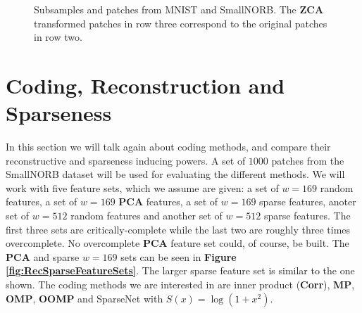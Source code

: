 \documentclass[12pt,a4paper,oneside,english]{UPBThesis}
\begin{document}
\begin{figure}
{  \label{fig:NORBSmallPatches}
}
\caption{Subsamples and patches from MNIST and SmallNORB. The \textbf{ZCA} transformed patches in row three correspond to the original patches in row two.}
\label{fig:ViewsOfMNISTAndNORBSmall}
\end{figure}

\clearpage

\section{Coding, Reconstruction and Sparseness}
\label{sec:CodingReconstructionSparseness}

In this section we will talk again about coding methods, and compare their reconstructive and sparseness inducing powers. A set of $1000$ patches from the SmallNORB dataset will be used for evaluating the different methods. We will work with five feature sets, which we assume are given: a set of $w=169$ random features, a set of $w=169$ \textbf{PCA} features, a set of $w=169$ sparse features, anoter set of $w=512$ random features and another set of $w=512$ sparse features. The first three sets are critically-complete while the last two are roughly three times overcomplete. No overcomplete \textbf{PCA} feature set could, of course, be built. The \textbf{PCA} and sparse $w=169$ sets can be seen in \textbf{Figure \ref{fig:RecSparseFeatureSets}}. The larger sparse feature set is similar to the one shown. The coding methods we are interested in are inner product (\textbf{Corr}), \textbf{MP}, \textbf{OMP}, \textbf{OOMP} and SparseNet with $S(x) = \log(1 + x^2)$.
\end{document}
